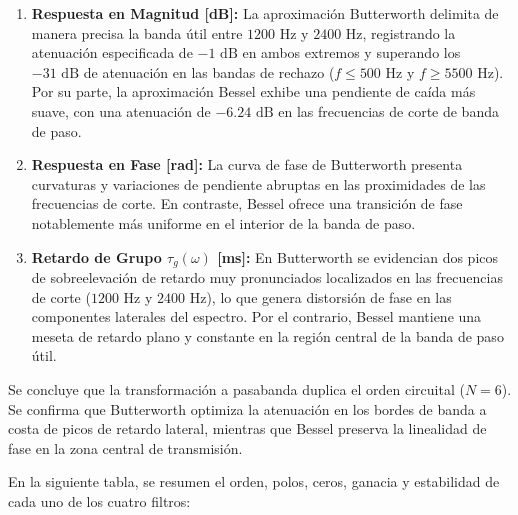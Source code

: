 \documentclass[12pt]{article}
\begin{document}
\begin{enumerate}
    \item \textbf{Respuesta en Magnitud [dB]:} 
    La aproximación Butterworth delimita de manera precisa la banda útil entre $1200\text{ Hz}$ y $2400\text{ Hz}$, registrando la atenuación especificada de $-1\text{ dB}$ en ambos extremos y superando los $-31\text{ dB}$ de atenuación en las bandas de rechazo ($f \le 500\text{ Hz}$ y $f \ge 5500\text{ Hz}$). Por su parte, la aproximación Bessel exhibe una pendiente de caída más suave, con una atenuación de $-6.24\text{ dB}$ en las frecuencias de corte de banda de paso.

    \item \textbf{Respuesta en Fase [rad]:} 
    La curva de fase de Butterworth presenta curvaturas y variaciones de pendiente abruptas en las proximidades de las frecuencias de corte. En contraste, Bessel ofrece una transición de fase notablemente más uniforme en el interior de la banda de paso.

    \item \textbf{Retardo de Grupo $\tau_g(\omega)$ [ms]:} 
    En Butterworth se evidencian dos picos de sobreelevación de retardo muy pronunciados localizados en las frecuencias de corte ($1200\text{ Hz}$ y $2400\text{ Hz}$), lo que genera distorsión de fase en las componentes laterales del espectro. Por el contrario, Bessel mantiene una meseta de retardo plano y constante en la región central de la banda de paso útil.
\end{enumerate}

 Se concluye que la transformación a pasabanda duplica el orden circuital ($N=6$). Se confirma que Butterworth optimiza la atenuación en los bordes de banda a costa de picos de retardo lateral, mientras que Bessel preserva la linealidad de fase en la zona central de transmisión.

 En la siguiente tabla, se resumen el orden, polos, ceros, ganacia y estabilidad de cada uno de los cuatro filtros:
\end{document}
